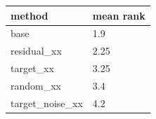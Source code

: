 \begin{tabular}{ll}
\toprule
method & mean rank \\
\midrule
base & 1.9 \\
residual\_xx & 2.25 \\
target\_xx & 3.25 \\
random\_xx & 3.4 \\
target\_noise\_xx & 4.2 \\
\bottomrule
\end{tabular}
